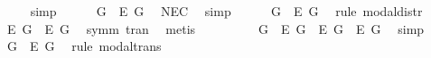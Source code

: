 \begin{isabellebody}
\ \ \ \ \isamarkupfalse%
\ simp\ %
\isanewline
\ \ \isamarkupfalse%
\ {\isachardoublequoteopen}{\isasymlfloor}\isactrlbold {\isasymbox}{\isacharparenleft}\isactrlbold {\isasymexists}\ G\ \isactrlbold {\isasymrightarrow}\ \isactrlbold {\isasymbox}\isactrlbold {\isasymexists}\isactrlsup E\ G{\isacharparenright}{\isasymrfloor}{\isachardoublequoteclose}\ \isamarkupfalse%
\ NEC\ \isamarkupfalse%
\ simp\isanewline
\ \ \isamarkupfalse%
\ {}{\isacharcolon}\ {\isachardoublequoteopen}{\isasymlfloor}\isactrlbold {\isasymdiamond}\isactrlbold {\isasymexists}\ G\ \isactrlbold {\isasymrightarrow}\ \isactrlbold {\isasymdiamond}\isactrlbold {\isasymbox}\isactrlbold {\isasymexists}\isactrlsup E\ G{\isasymrfloor}{\isachardoublequoteclose}\ \isamarkupfalse%
\ {\isacharparenleft}rule\ modal{\isacharunderscore}distr{\isacharparenright}\isanewline
\ \ \isamarkupfalse%
\ {}{\isacharcolon}\ {\isachardoublequoteopen}{\isasymlfloor}\isactrlbold {\isasymdiamond}\isactrlbold {\isasymbox}\isactrlbold {\isasymexists}\isactrlsup E\ G\ \isactrlbold {\isasymrightarrow}\ \isactrlbold {\isasymbox}\isactrlbold {\isasymexists}\isactrlsup E\ G{\isasymrfloor}{\isachardoublequoteclose}\ \isamarkupfalse%
\ symm\ tran\ \isamarkupfalse%
\ metis\ %
\isanewline
\ \ \isamarkupfalse%
\ {}\ {}\ \isamarkupfalse%
\ {\isachardoublequoteopen}{\isasymlfloor}\isactrlbold {\isasymdiamond}\isactrlbold {\isasymexists}\ G\ \isactrlbold {\isasymrightarrow}\ \isactrlbold {\isasymdiamond}\isactrlbold {\isasymbox}\isactrlbold {\isasymexists}\isactrlsup E\ G{\isasymrfloor}\ {\isasymand}\ {\isasymlfloor}\isactrlbold {\isasymdiamond}\isactrlbold {\isasymbox}\isactrlbold {\isasymexists}\isactrlsup E\ G\ \isactrlbold {\isasymrightarrow}\ \isactrlbold {\isasymbox}\isactrlbold {\isasymexists}\isactrlsup E\ G{\isasymrfloor}{\isachardoublequoteclose}\ \isamarkupfalse%
\ simp\isanewline
\ \ \isamarkupfalse%
\ {\isachardoublequoteopen}{\isasymlfloor}\isactrlbold {\isasymdiamond}\isactrlbold {\isasymexists}\ G\ \isactrlbold {\isasymrightarrow}\ \isactrlbold {\isasymbox}\isactrlbold {\isasymexists}\isactrlsup E\ G{\isasymrfloor}{\isachardoublequoteclose}\ \isamarkupfalse%
\ {\isacharparenleft}rule\ modal{\isacharunderscore}trans{\isacharparenright}\isanewline
\ \ \isamarkupfalse%

\end{isabellebody}
